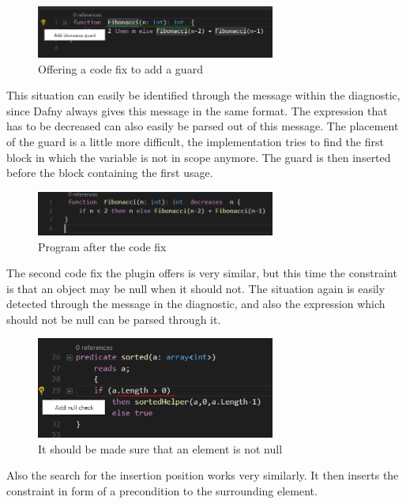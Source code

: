   \begin{figure}[H]
	\centering
	\includegraphics[width=0.7\textwidth]{img/decreaseGuard}
	\caption{Offering a code fix to add a guard}
	\label{fig:decreaseguard}
\end{figure}
This situation can easily be identified through the message within the diagnostic, since Dafny always gives this message in the same format. The expression that has to be decreased can also easily be parsed out of this message. The placement of the guard is a little more difficult, the implementation tries to find the first block in which the variable is not in scope anymore. The guard is then inserted before the block containing the first usage. \newline
  \begin{figure}[H]
	\centering
	\includegraphics[width=0.7\textwidth]{img/decreaseGuardApplied}
	\caption{Program after the code fix}
	\label{fig:decreaseguardapplied}
\end{figure}
The second code fix the plugin offers is very similar, but this time the constraint is that an object may be null when it should not. The situation again is easily detected through the message in the diagnostic, and also the expression which should not be null can be parsed through it.
  \begin{figure}[H]
	\centering
	\includegraphics[width=0.7\textwidth]{img/nullCheck}
	\caption{It should be made sure that an element is not null}
	\label{fig:nullcheck}
\end{figure}
Also the search for the insertion position works very similarly. It then inserts the constraint in form of a precondition to the surrounding element. \newline
